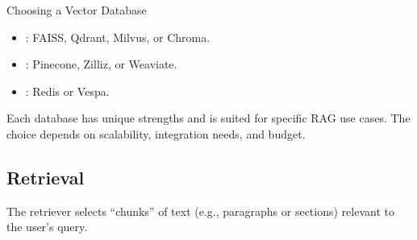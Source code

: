 \documentclass[letterpaper,11pt,english]{sphinxmanual}
\begin{document}
\sphinxAtStartPar
Choosing a Vector Database
\begin{itemize}
\item {} 
\sphinxAtStartPar
{}: FAISS, Qdrant, Milvus, or Chroma.

\item {} 
\sphinxAtStartPar
{}: Pinecone, Zilliz, or Weaviate.

\item {} 
\sphinxAtStartPar
{}: Redis or Vespa.

\end{itemize}

\sphinxAtStartPar
Each database has unique strengths and is suited for specific RAG use cases. The choice depends on scalability, integration needs, and budget.


\subsection{Retrieval}
\label{\detokenize{rag:retrieval}}
\sphinxAtStartPar
The retriever selects “chunks” of text (e.g., paragraphs or sections) relevant to the user’s query.
\end{document}
